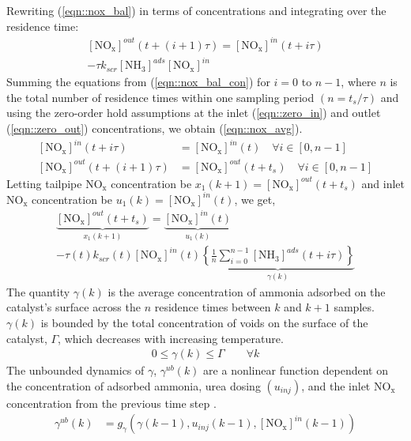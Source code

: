 \documentclass[subscriptcorrection,upint,varvw,barcolor=Goldenrod3,mathalfa=cal=euler,balance,hyphenate,french,pdf-a]{asmejour}
\newcommand{\lr}[1]{\left( #1 \right)}
\newcommand{\lrb}[1]{\left[ #1 \right]}
\newcommand{\lrf}[1]{\left\{ #1 \right\}}
\newcommand{\con}[1]{\lrb{#1}}
\newcommand{\nox}{\text{NO}_{\text{x}}}
\newcommand{\ammonia}{\text{NH}_{3}}
\begin{document}
Rewriting (\ref{eqn::nox_bal}) in terms of concentrations and integrating over the residence time:
\begin{multline}
        \con{\nox}^{out} (t + (i+1) \tau) =
        \con{\nox}^{in} (t + i \tau) \\
        -\tau k_{scr} \con{\ammonia}^{ads} \con{\nox}^{in}
        \label{eqn::nox_bal_con}
\end{multline}
Summing the equations from (\ref{eqn::nox_bal_con}) for  $i = 0$ to $n-1$, where $n$ is the total number of residence
times within one sampling period $(n= t_s/\tau)$ and using the zero-order hold assumptions at the inlet
(\ref{eqn::zero_in}) and outlet (\ref{eqn::zero_out}) concentrations, we obtain (\ref{eqn::nox_avg}).
\begin{align}
        \con{\nox}^{in} (t + i \tau)      & = \con{\nox}^{in}(t) \quad \forall i \in [0, n-1]  \label{eqn::zero_in}        \\
        \con{\nox}^{out} (t + (i+1) \tau) & = \con{\nox}^{out}(t + t_s) \quad \forall i \in [0, n-1] \label{eqn::zero_out}
\end{align}
Letting tailpipe $\nox$ concentration be $x_1(k+1) = \con{\nox}^{out}(t+t_s)$ and inlet $\nox$ concentration be $u_1(k) = \con{\nox}^{in}(t)$, we get,
\begin{multline}
        \underbrace{\con{\nox}^{out}(t+t_s)}_{x_1(k+1)} = \underbrace{\con{\nox}^{in}(t)}_{u_1(k)} \\
        - \tau(t) k_{scr}(t) \con{\nox}^{in}(t) \underbrace{\lrf{\frac{1}{n} \sum_{i = 0}^{n-1} \con{\ammonia}^{ads}(t + i \tau)}}_{\gamma(k)}
        \label{eqn::nox_avg}
\end{multline}
%
%
The quantity $\gamma(k)$ is the average concentration of ammonia adsorbed on the catalyst's surface across the $n$ residence times between $k$ and $k+1$ samples. $\gamma(k)$ is bounded by the total concentration of voids on the surface of the catalyst, $\Gamma$, which decreases with increasing temperature.
\begin{align}
        0 \leq \gamma(k) \leq \Gamma \qquad \forall k
\end{align}
The unbounded dynamics of $\gamma$, $\gamma^{ub}(k)$ are a nonlinear function dependent on the concentration of adsorbed ammonia, urea dosing $\lr{u_{inj}}$, and the inlet $\nox$ concentration from the previous time step \cite{charla2026board}.
\begin{align}
        \gamma^{ub}(k) & = g_{\gamma} \lr{ \gamma(k-1), u_{inj}(k-1), \con{\nox}^{in}(k-1) }
\end{align}
\end{document}
